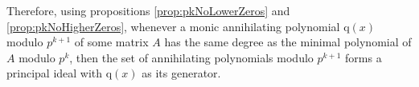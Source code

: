 \documentclass[a4paper, 12pt, reqno]{amsart}
\begin{document}
		Therefore, using propositions \ref{prop:pkNoLowerZeros} and \ref{prop:pkNoHigherZeros}, whenever a monic annihilating polynomial q$(x)$ modulo $p^{k+1}$ of some 
		matrix $A$ has the same degree as the minimal polynomial of $A$ modulo $p^k$, then the set of annihilating polynomials modulo $p^{k+1}$ forms a principal ideal
		with q$(x)$ as its generator.
		
\end{document}
